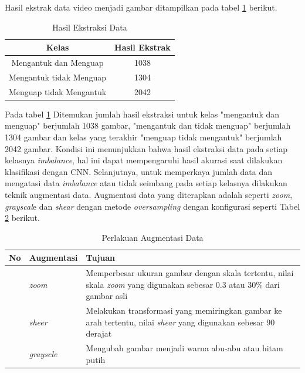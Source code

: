      
     Hasil ekstrak data video menjadi gambar ditampilkan pada tabel \ref{Hasil Ekstraksi Data} berikut. 

       \begin{table}[H]
            \centering
            \caption{Hasil Ekstraksi Data}
            \begin{tabular}{cc}
                \toprule
                \textbf{Kelas} & \textbf{Hasil Ekstrak} \\
                \midrule  
                           Mengantuk dan Menguap & 1038  \\
                          Mengantuk tidak Menguap & 1304 \\
                           Menguap tidak Mengantuk& 2042  \\
                
                    \bottomrule
                \end{tabular}
                \label{Hasil Ekstraksi Data}
            \end{table}

        Pada tabel \ref{Hasil Ekstraksi Data} Ditemukan jumlah hasil ekstraksi untuk kelas "mengantuk dan menguap" 
        berjumlah 1038 gambar, "mengantuk dan tidak menguap" berjumlah 1304 gambar dan kelas yang terakhir
         "menguap tidak mengantuk" berjumlah 2042 gambar. Kondisi ini menunjukkan bahwa hasil ekstraksi 
         data pada setiap kelasnya \textit{imbalance}, hal ini dapat mempengaruhi hasil akurasi saat 
         dilakukan klasifikasi dengan CNN. Selanjutnya, untuk memperkaya jumlah data dan mengatasi 
         data \textit{imbalance} atau tidak seimbang pada setiap kelasnya dilakukan teknik augmentasi data. 
         Augmentasi data yang diterapkan adalah seperti \textit{zoom}, \textit{grayscal}e dan \textit{shear} 
         dengan metode \textit{oversampling} dengan konfigurasi seperti Tabel \ref{Perlakuan Augmentasi Data} berikut.

        
\begin{table}[H]
    \centering
    \caption{Perlakuan Augmentasi Data}
    \label{Perlakuan Augmentasi Data}
    \begin{tabular}{
        >{\raggedright\arraybackslash}p{1.0cm} 
        >{\raggedright\arraybackslash}p{2.5cm} 
        >{\raggedright\arraybackslash}p{9.3cm}}
        \hline
        \textbf{No} & \textbf{Augmentasi} & \textbf{Tujuan} \\
        \hline
        1 & \textit{zoom} & Memperbesar ukuran gambar dengan skala tertentu, nilai skala \textit{zoom} yang digunakan sebesar 0.3 atau 30\% dari gambar asli \\
        2 & \textit{sheer} & Melakukan transformasi yang memiringkan gambar ke arah tertentu, nilai \textit{shear} yang digunakan sebesar 90 derajat \\
        3 & \textit{grayscle} & Mengubah  gambar menjadi warna abu-abu atau hitam putih \\
        
        \hline
    \end{tabular}
\end{table}

